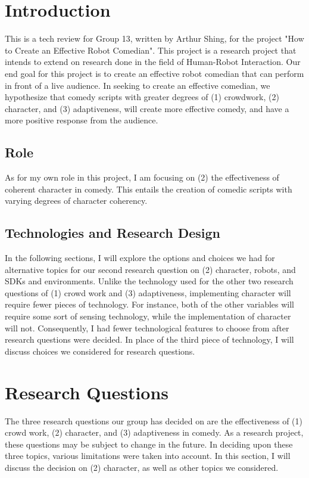\documentclass[onecolumn, draftclsnofoot,10pt, compsoc]{IEEEtran}
\begin{document}


\section{Introduction}

This is a tech review for Group 13, written by Arthur Shing, for the project "How to Create an Effective Robot Comedian".
This project is a research project that intends to extend on research done in the field of Human-Robot Interaction.
Our end goal for this project is to create an effective robot comedian that can perform in front of a live audience.
In seeking to create an effective comedian, we hypothesize that comedy scripts with greater degrees of (1) crowdwork, (2) character, and (3) adaptiveness, will create more effective comedy, and have a more positive response from the audience.

\subsection{Role}
As for my own role in this project, I am focusing on (2) the effectiveness of coherent character in comedy.
This entails the creation of comedic scripts with varying degrees of character coherency.

\subsection{Technologies and Research Design}
In the following sections, I will explore the options and choices we had for alternative topics for our second research question on (2) character, robots, and SDKs and environments. Unlike the technology used for the other two research questions of (1) crowd work and (3) adaptiveness, implementing character will require fewer pieces of technology. For instance, both of the other variables will require some sort of sensing technology, while the implementation of character will not. Consequently, I had fewer technological features to choose from after research questions were decided. In place of the third piece of technology, I will discuss choices we considered for research questions.


\section{Research Questions}
The three research questions our group has decided on are the effectiveness of (1) crowd work, (2) character, and (3) adaptiveness in comedy. As a research project, these questions may be subject to change in the future. In deciding upon these three topics, various limitations were taken into account. In this section, I will discuss the decision on (2) character, as well as other topics we considered.
\end{document}
